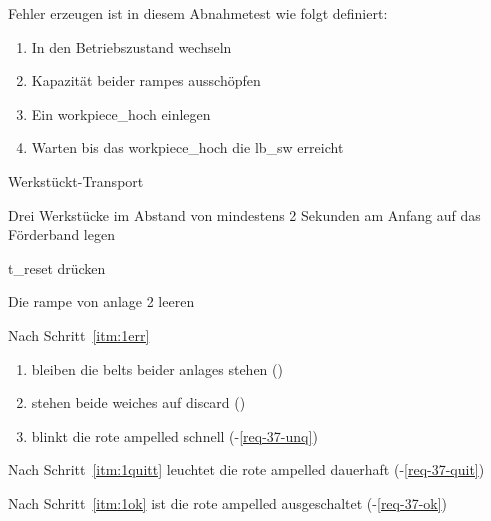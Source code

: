 \label{abntest-durchlassablauf}

\begin{anmerkungen}
    \item Fehler erzeugen ist in diesem Abnahmetest wie folgt definiert:
    \begin{enumerate}
        \item In den Betriebszustand wechseln
        \item Kapazität beider \glspl{rampe} ausschöpfen
        \item Ein \gls{workpiece_hoch} einlegen
        \item Warten bis das \gls{workpiece_hoch} die \gls{lb_sw} erreicht
    \end{enumerate}
\end{anmerkungen}

\begin{ablauf}{Werkstückt-Transport}
    \item  Drei Werkstücke im Abstand von mindestens 2 Sekunden am Anfang auf das Förderband legen
    \item\label{itm:1quitt} \gls{t_reset} drücken
    \item\label{itm:1ok} Die \gls{rampe} von \gls{anlage} 2 leeren
\end{ablauf}
\begin{erwartung}
    \item Nach Schritt~\ref{itm:1err}
    \begin{enumerate}
        \item bleiben die \glspl{belt} beider \glspl{anlage} stehen ()
        \item stehen beide \glspl{weiche} auf \gls{discard} ()
        \item blinkt die rote \gls{ampelled} schnell (-\ref{req-37-unq})
    \end{enumerate}
    \item Nach Schritt~\ref{itm:1quitt} leuchtet die rote \gls{ampelled} dauerhaft (-\ref{req-37-quit})
    \item Nach Schritt~\ref{itm:1ok} ist die rote \gls{ampelled} ausgeschaltet (-\ref{req-37-ok})
\end{erwartung}

